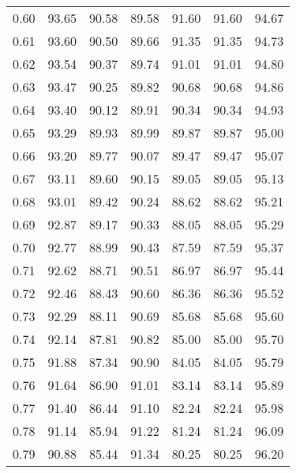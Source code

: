 \begin{tabular}{|c|c|c|c|c|c|c|}
      0.60 &     93.65 &     90.58 &      89.58 &   91.60 &      91.60 &         94.67 \\
      0.61 &     93.60 &     90.50 &      89.66 &   91.35 &      91.35 &         94.73 \\
      0.62 &     93.54 &     90.37 &      89.74 &   91.01 &      91.01 &         94.80 \\
      0.63 &     93.47 &     90.25 &      89.82 &   90.68 &      90.68 &         94.86 \\
      0.64 &     93.40 &     90.12 &      89.91 &   90.34 &      90.34 &         94.93 \\
      0.65 &     93.29 &     89.93 &      89.99 &   89.87 &      89.87 &         95.00 \\
      0.66 &     93.20 &     89.77 &      90.07 &   89.47 &      89.47 &         95.07 \\
      0.67 &     93.11 &     89.60 &      90.15 &   89.05 &      89.05 &         95.13 \\
      0.68 &     93.01 &     89.42 &      90.24 &   88.62 &      88.62 &         95.21 \\
      0.69 &     92.87 &     89.17 &      90.33 &   88.05 &      88.05 &         95.29 \\
      0.70 &     92.77 &     88.99 &      90.43 &   87.59 &      87.59 &         95.37 \\
      0.71 &     92.62 &     88.71 &      90.51 &   86.97 &      86.97 &         95.44 \\
      0.72 &     92.46 &     88.43 &      90.60 &   86.36 &      86.36 &         95.52 \\
      0.73 &     92.29 &     88.11 &      90.69 &   85.68 &      85.68 &         95.60 \\
      0.74 &     92.14 &     87.81 &      90.82 &   85.00 &      85.00 &         95.70 \\
      0.75 &     91.88 &     87.34 &      90.90 &   84.05 &      84.05 &         95.79 \\
      0.76 &     91.64 &     86.90 &      91.01 &   83.14 &      83.14 &         95.89 \\
      0.77 &     91.40 &     86.44 &      91.10 &   82.24 &      82.24 &         95.98 \\
      0.78 &     91.14 &     85.94 &      91.22 &   81.24 &      81.24 &         96.09 \\
      0.79 &     90.88 &     85.44 &      91.34 &   80.25 &      80.25 &         96.20 \\

\end{tabular}
